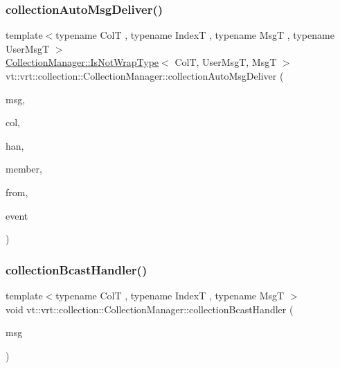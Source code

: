 \subsubsection{\texorpdfstring{collection\+Auto\+Msg\+Deliver()}{collectionAutoMsgDeliver()}\hspace{0.1cm}{\footnotesize\ttfamily [2/2]}}
{\footnotesize\ttfamily template$<$typename ColT , typename IndexT , typename MsgT , typename User\+MsgT $>$ \\
\hyperlink{structvt_1_1vrt_1_1collection_1_1_collection_manager_a18e3a17d9eb086c6c2f499242b7faa1e}{Collection\+Manager\+::\+Is\+Not\+Wrap\+Type}$<$ ColT, User\+MsgT, MsgT $>$ vt\+::vrt\+::collection\+::\+Collection\+Manager\+::collection\+Auto\+Msg\+Deliver (\begin{DoxyParamCaption}\item[{MsgT $\ast$}]{msg,  }\item[{\hyperlink{structvt_1_1vrt_1_1collection_1_1_collection_base}{Collection\+Base}$<$ ColT, IndexT $>$ $\ast$}]{col,  }\item[{\hyperlink{namespacevt_af64846b57dfcaf104da3ef6967917573}{Handler\+Type}}]{han,  }\item[{bool}]{member,  }\item[{\hyperlink{namespacevt_a866da9d0efc19c0a1ce79e9e492f47e2}{Node\+Type}}]{from,  }\item[{\hyperlink{namespacevt_1_1trace_a64a7185f3e102df8d8258f263ccd1582}{trace\+::\+Trace\+Event\+I\+D\+Type}}]{event }\end{DoxyParamCaption})\hspace{0.3cm}{\ttfamily [static]}}

\mbox{\label{structvt_1_1vrt_1_1collection_1_1_collection_manager_a2a9fcbafc83d78d80c8d5f758e880b47}} 
\subsubsection{\texorpdfstring{collection\+Bcast\+Handler()}{collectionBcastHandler()}}
{\footnotesize\ttfamily template$<$typename ColT , typename IndexT , typename MsgT $>$ \\
void vt\+::vrt\+::collection\+::\+Collection\+Manager\+::collection\+Bcast\+Handler (\begin{DoxyParamCaption}\item[{MsgT $\ast$}]{msg }\end{DoxyParamCaption})\hspace{0.3cm}{\ttfamily [static]}}

